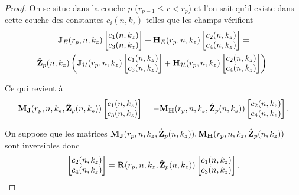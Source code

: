     \begin{proof}
      On se situe dans la couche \(p\) (\(r_{p-1}\le r < r_p\)) et l'on sait qu'il existe dans cette couche des constantes \(c_i(n,k_z)\) telles que les champs vérifient
      \begin{multline*}
        \mathbf{J}_{E}(r_{p},n,k_z)
        \begin{bmatrix}
          c_1(n,k_z) \\
          c_3(n,k_z)
        \end{bmatrix}
        +
        \mathbf{H}_{E}(r_{p},n,k_z)
        \begin{bmatrix}
          c_2(n,k_z) \\
          c_4(n,k_z)
        \end{bmatrix}
        =
        \\
        \hat {\mathbf{Z}}_{p}(n,k_z)
        \left(
          \mathbf{J}_{\mathcal{H}}(r_{p},n,k_z)
          \begin{bmatrix}
            c_1(n,k_z) \\
            c_3(n,k_z)
          \end{bmatrix}
          +
          \mathbf{H}_{\mathcal{H}}(r_{p},n,k_z)
          \begin{bmatrix}
            c_2(n,k_z) \\
            c_4(n,k_z)
          \end{bmatrix}
        \right).
      \end{multline*}

      Ce qui revient à 
      \begin{equation*}
        \mathbf{M}_{\mathbf{J}}(r_{p},n,k_z,\hat{\mathbf{Z}}_p(n,k_z))
        \begin{bmatrix}
          c_1(n,k_z) \\
          c_3(n,k_z)
        \end{bmatrix}
        =
        -\mathbf{M}_{\mathbf{H}}(r_{p},n,k_z,\hat{\mathbf{Z}}_p(n,k_z))
        \begin{bmatrix}
          c_2(n,k_z) \\
          c_4(n,k_z)
        \end{bmatrix}.
      \end{equation*}

      On suppose que les matrices \(\mathbf{M}_{\mathbf{J}}(r_p,n,k_z,\hat{\mathbf{Z}}_p(n,k_z)), \mathbf{M}_{\mathbf{H}}(r_p,n,k_z,\hat{\mathbf{Z}}_p(n,k_z))\) sont inversibles donc
      \begin{equation*}
        \begin{bmatrix}
          c_2(n,k_z) \\
          c_4(n,k_z)
        \end{bmatrix}
        =
        \mathbf{R}(r_{p},n,k_z,\hat{\mathbf{Z}}_p(n,k_z))
        \begin{bmatrix}
          c_1(n,k_z) \\
          c_3(n,k_z)
        \end{bmatrix}.
      \end{equation*}


\end{proof}
